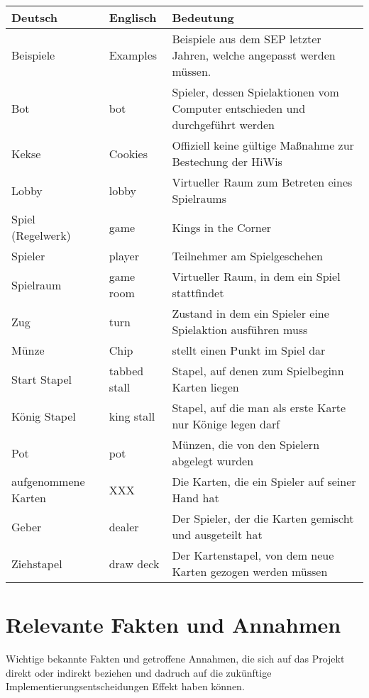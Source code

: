 \begin{center}
		\begin{longtable}{p{} p{} p{}}
			\textbf{Deutsch} & \textbf{Englisch} & \textbf{Bedeutung} \\
			\hline \hline \endhead
			Beispiele & Examples & Beispiele aus dem SEP letzter Jahren, welche angepasst werden müssen.\\                      
			Bot & bot & Spieler, dessen Spielaktionen vom Computer entschieden und durchgeführt werden\\
			Kekse & Cookies & Offiziell keine gültige Maßnahme zur Bestechung der HiWis\\          
 			Lobby & lobby & Virtueller Raum zum Betreten eines Spielraums\\	
			Spiel (Regelwerk) & game & Kings in the Corner \\
			Spieler & player & Teilnehmer am Spielgeschehen\\
			Spielraum & game room & Virtueller Raum, in dem ein Spiel stattfindet\\
			Zug & turn & Zustand in dem ein Spieler eine Spielaktion ausführen muss\\
			Münze & Chip & stellt einen Punkt im Spiel dar\\
			Start Stapel & tabbed stall & Stapel, auf denen zum Spielbeginn Karten liegen\\
			König Stapel & king stall & Stapel, auf die man als erste Karte nur Könige legen darf\\
			Pot & pot & Münzen, die von den Spielern abgelegt wurden\\
			aufgenommene Karten & XXX & Die Karten, die ein Spieler auf seiner Hand hat\\
			Geber & dealer & Der Spieler, der die Karten gemischt und ausgeteilt hat\\
			Ziehstapel & draw deck & Der Kartenstapel, von dem neue Karten gezogen werden müssen
		\end{longtable}
\end{center}

\section{Relevante Fakten und Annahmen}

Wichtige bekannte Fakten und getroffene Annahmen, die sich auf das Projekt direkt oder indirekt beziehen und dadruch auf die zukünftige Implementierungsentscheidungen Effekt haben können.

